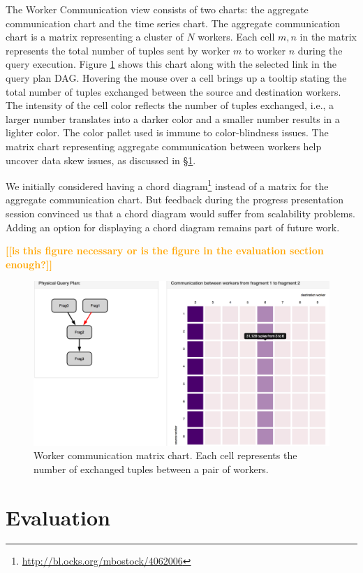 \documentclass{chi2009}
\newcommand{\todo}[1]{\textsf{\textbf{\textcolor{Orange}{[[#1]]}}}}
\begin{document}
The Worker Communication view consists of two charts: the aggregate communication
chart and the time series chart. The aggregate communication chart is a matrix representing
a cluster of $N$ workers. Each cell $m,n$ in the matrix represents the total number of tuples sent
by worker $m$ to worker $n$ during the query execution. Figure \ref{fig:matrix} shows this chart along
with the selected link in the query plan DAG. Hovering the mouse over a cell brings up a tooltip
stating the total number of tuples exchanged between the source and destination workers. The intensity
of the cell color reflects the number of tuples exchanged, i.e., a larger number translates into a darker color
and a smaller number results in a lighter color. The color pallet used is immune to color-blindness issues.
The matrix chart representing aggregate communication
between workers help uncover data skew issues, as discussed in \S \ref{sec:eval}.

We initially considered having a chord diagram\footnote{\url{http://bl.ocks.org/mbostock/4062006}} instead of a matrix
for the aggregate communication chart. But feedback during the progress presentation session convinced us that
a chord diagram would suffer from scalability problems. Adding an option for displaying a chord diagram remains
part of future work.

\todo{is this figure necessary or is the figure in the evaluation section enough?}

\begin{figure}[ht]
  \includegraphics[width=\columnwidth]{images/networkVis1}
  \caption{Worker communication matrix chart. Each cell represents the number of exchanged tuples between a
  pair of workers.}
  \label{fig:matrix}
\end{figure}


\section{Evaluation}
\label{sec:eval}
\end{document}
